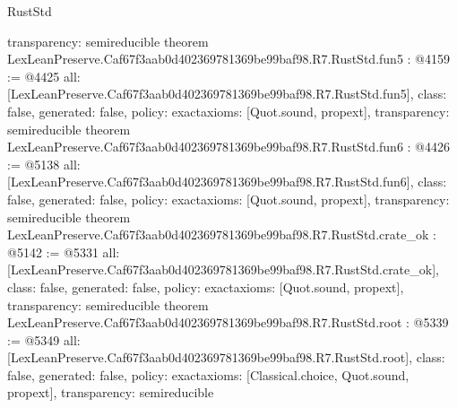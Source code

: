 \begin{lexlean}{RustStd}
\begin{coremodule}
{  transparency: semireducible
}
theorem LexLeanPreserve.Caf67f3aab0d402369781369be99baf98.R7.RustStd.fun5 : @4159 := @4425 {
  all: [LexLeanPreserve.Caf67f3aab0d402369781369be99baf98.R7.RustStd.fun5],
  class: false,
  generated: false,
  policy: exact{axioms: [Quot.sound, propext]},
  transparency: semireducible
}
theorem LexLeanPreserve.Caf67f3aab0d402369781369be99baf98.R7.RustStd.fun6 : @4426 := @5138 {
  all: [LexLeanPreserve.Caf67f3aab0d402369781369be99baf98.R7.RustStd.fun6],
  class: false,
  generated: false,
  policy: exact{axioms: [Quot.sound, propext]},
  transparency: semireducible
}
theorem LexLeanPreserve.Caf67f3aab0d402369781369be99baf98.R7.RustStd.crate_ok : @5142 := @5331 {
  all: [LexLeanPreserve.Caf67f3aab0d402369781369be99baf98.R7.RustStd.crate_ok],
  class: false,
  generated: false,
  policy: exact{axioms: [Quot.sound, propext]},
  transparency: semireducible
}
theorem LexLeanPreserve.Caf67f3aab0d402369781369be99baf98.R7.RustStd.root : @5339 := @5349 {
  all: [LexLeanPreserve.Caf67f3aab0d402369781369be99baf98.R7.RustStd.root],
  class: false,
  generated: false,
  policy: exact{axioms: [Classical.choice, Quot.sound, propext]},
  transparency: semireducible
}


\end{coremodule}
\end{lexlean}
